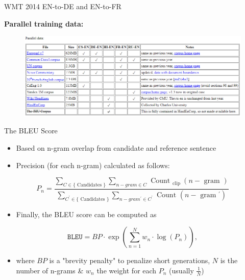 \begin{vbframe}{WMT 2014 EN-to-DE and EN-to-FR}

\vfill

\textbf{Parallel training data:}

\begin{figure}
	\centering
		\includegraphics[width=.9\textwidth]{figure/wmt14}
\end{figure}
\vfill

\end{vbframe}


\begin{vbframe}{The BLEU Score}

\vfill

\begin{itemize}
	\item Based on n-gram overlap from candidate and reference sentence
	\item Precision (for each n-gram) calculated as follows:
\end{itemize}

\begin{equation}
            P_{n} = \frac{\sum_{C \in\{\text { Candidates }\}} \sum_{n-g r a m \in C} \text { Count }_{\text {clip }}(n-\text { gram })}{\sum_{C^{\prime} \in\{\text { Candidates }\}}{\sum_{n-g r a m^{\prime} \in C^{\prime}} \text { Count }\left(n-\text { gram }^{\prime}\right)}}  \nonumber
\end{equation}

\begin{itemize}
	\item Finally, the BLEU score can be computed as
\end{itemize}

\begin{equation}
            \texttt{BLEU} = BP \cdot \exp\left(\sum_{n=1}^{N} w_n \cdot \log(P_n)\right), \nonumber
\end{equation}

\begin{itemize}
	\item where $BP$ is a "brevity penalty" to penalize short generations, $N$ is the number of n-grams \& $w_n$ the weight for each $P_n$ (usually $\frac{1}{N}$)
\end{itemize}

\vfill

\end{vbframe}

